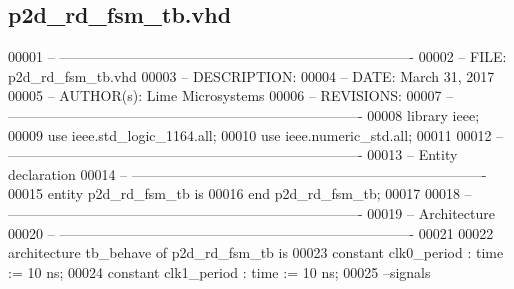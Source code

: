 \subsection{p2d\+\_\+rd\+\_\+fsm\+\_\+tb.\+vhd}
\label{p2d__rd__fsm__tb_8vhd_source}

\begin{DoxyCode}
00001 \textcolor{keyword}{-- ---------------------------------------------------------------------------- }
00002 \textcolor{keyword}{-- FILE:    p2d\_rd\_fsm\_tb.vhd}
00003 \textcolor{keyword}{-- DESCRIPTION: }
00004 \textcolor{keyword}{-- DATE:    March 31, 2017}
00005 \textcolor{keyword}{-- AUTHOR(s):   Lime Microsystems}
00006 \textcolor{keyword}{-- REVISIONS:}
00007 \textcolor{keyword}{-- ---------------------------------------------------------------------------- }
00008 \textcolor{vhdlkeyword}{library }\textcolor{keywordflow}{ieee};
00009 \textcolor{vhdlkeyword}{use }ieee.std\_logic\_1164.\textcolor{keywordflow}{all};
00010 \textcolor{vhdlkeyword}{use }ieee.numeric\_std.\textcolor{keywordflow}{all};
00011 
00012 \textcolor{keyword}{-- ----------------------------------------------------------------------------}
00013 \textcolor{keyword}{-- Entity declaration}
00014 \textcolor{keyword}{-- ----------------------------------------------------------------------------}
00015 \textcolor{keywordflow}{entity }p2d_rd_fsm_tb \textcolor{keywordflow}{is}
00016 \textcolor{keywordflow}{end} \textcolor{vhdlchar}{p2d\_rd\_fsm\_tb};
00017 
00018 \textcolor{keyword}{-- ----------------------------------------------------------------------------}
00019 \textcolor{keyword}{-- Architecture}
00020 \textcolor{keyword}{-- ----------------------------------------------------------------------------}
00021 
00022 \textcolor{keywordflow}{architecture} tb\_behave \textcolor{keywordflow}{of} p2d_rd_fsm_tb is
00023 \textcolor{keywordflow}{constant} \textcolor{vhdlchar}{clk0_period}   \textcolor{vhdlchar}{:} \textcolor{comment}{time} \textcolor{vhdlchar}{:=} \textcolor{vhdllogic}{}\textcolor{vhdllogic}{10} \textcolor{vhdlchar}{ns};
00024 \textcolor{keywordflow}{constant} \textcolor{vhdlchar}{clk1_period}   \textcolor{vhdlchar}{:} \textcolor{comment}{time} \textcolor{vhdlchar}{:=} \textcolor{vhdllogic}{}\textcolor{vhdllogic}{10} \textcolor{vhdlchar}{ns}; 
00025 \textcolor{keyword}{   --signals}

\end{DoxyCode}
